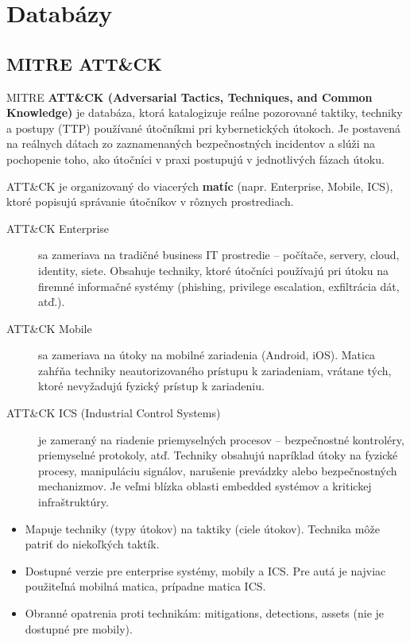 \documentclass[11pt]{article}
\begin{document}
\section{Databázy}

\subsection{MITRE ATT\&CK}

MITRE \textbf{ATT\&CK (Adversarial Tactics, Techniques, and Common Knowledge)} je databáza, ktorá katalogizuje reálne pozorované taktiky, techniky a postupy (TTP) používané útočníkmi pri kybernetických útokoch. Je postavená na reálnych dátach zo zaznamenaných bezpečnostných incidentov a slúži na pochopenie toho, ako útočníci v praxi postupujú v jednotlivých fázach útoku.

ATT\&CK je organizovaný do viacerých \textbf{matíc} (napr. Enterprise, Mobile, ICS), ktoré popisujú správanie útočníkov v rôznych prostrediach.

\begin{description}
    \item[ATT\&CK Enterprise] sa zameriava na tradičné business IT prostredie -- počítače, servery, cloud, identity, siete. Obsahuje techniky, ktoré útočníci používajú pri útoku na firemné informačné systémy (phishing, privilege escalation, exfiltrácia dát, atď.).

    \item[ATT\&CK Mobile] sa zameriava na útoky na mobilné zariadenia (Android, iOS). Matica zahŕňa techniky neautorizovaného prístupu k zariadeniam, vrátane tých, ktoré nevyžadujú fyzický prístup k zariadeniu.

    \item[ATT\&CK ICS (Industrial Control Systems)] je zameraný na riadenie priemyselných procesov -- bezpečnostné kontroléry, priemyselné protokoly, atď. Techniky obsahujú napríklad útoky na fyzické procesy, manipuláciu signálov, narušenie prevádzky alebo bezpečnostných mechanizmov. Je veľmi blízka oblasti embedded systémov a kritickej infraštruktúry.
\end{description}

\begin{itemize}
    \item Mapuje techniky (typy útokov) na taktiky (ciele útokov). Technika môže patriť do niekoľkých taktík.
    \item Dostupné verzie pre enterprise systémy, mobily a ICS. Pre autá je najviac použiteľná mobilná matica, prípadne matica ICS.
    \item Obranné opatrenia proti technikám: mitigations, detections, assets (nie je dostupné pre mobily).
\end{itemize}
\end{document}
